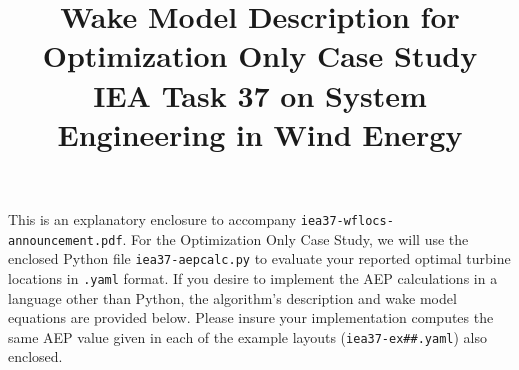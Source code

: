 \documentclass[10pt]{article}
\begin{document}
\title{Wake Model Description for Optimization Only Case Study \\
    \small{IEA Task 37 on System Engineering in Wind Energy}}
    \date{\vspace{-1.8cm}}
\setlength{\droptitle}{-5em}
\maketitle

This is an explanatory enclosure to accompany \texttt{iea37-wflocs-announcement.pdf}.  For the Optimization Only Case Study, we will use the enclosed Python file \texttt{iea37-aepcalc.py} to evaluate your reported optimal turbine locations in \texttt{.yaml} format.
If you desire to implement the AEP calculations in a language other than Python, the algorithm's description and wake model equations are provided below.
Please insure your implementation computes the same AEP value given in each of the example layouts (\texttt{iea37-ex\#\#.yaml}) also enclosed.
\end{document}

